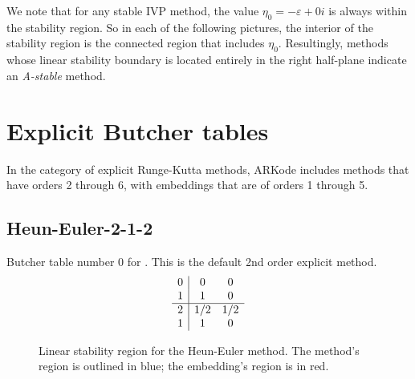 \documentclass[letterpaper,10pt,english]{sphinxmanual}
\begin{document}
We note that for any stable IVP method, the value $\eta_0 =
-\varepsilon + 0i$ is always within the stability region.  So in each
of the following pictures, the interior of the stability region is the
connected region that includes $\eta_0$.  Resultingly, methods
whose linear stability boundary is located entirely in the right
half-plane indicate an \emph{A-stable} method.


\section{Explicit Butcher tables}
\label{Butcher:explicit-butcher-tables}\label{Butcher:butcher-explicit}
In the category of explicit Runge-Kutta methods, ARKode includes
methods that have orders 2 through 6, with embeddings that are of
orders 1 through 5.


\subsection{Heun-Euler-2-1-2}
\label{Butcher:butcher-heun-euler}\label{Butcher:heun-euler-2-1-2}
Butcher table number 0
for {\hyperref[c_interface/User_callable:ARKodeSetERKTableNum]{}}.  This is
the default 2nd order explicit method.
\begin{gather}
\begin{split}\begin{array}{r|cc}
  0 & 0 & 0 \\
  1 & 1 & 0 \\
  \hline
  2 & 1/2 & 1/2 \\
  1 & 1 & 0
\end{array}\end{split}\notag
\end{gather}\begin{figure}[htbp]
\centering
\capstart

\caption{Linear stability region for the Heun-Euler method.  The method's
region is outlined in blue; the embedding's region is in red.}\end{figure}
\end{document}
